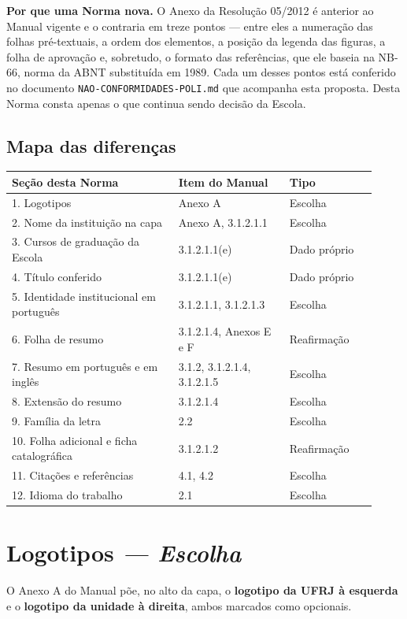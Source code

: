 \documentclass[a4paper,11pt]{article}
\newcommand\tipo[1]{\normalfont\textit{--- #1}}
\begin{document}
\textbf{Por que uma Norma nova.} O Anexo da Resolução 05/2012 é anterior ao
Manual vigente e o contraria em treze pontos --- entre eles a numeração das
folhas pré-textuais, a ordem dos elementos, a posição da legenda das figuras, a
folha de aprovação e, sobretudo, o formato das referências, que ele baseia na
NB-66, norma da ABNT substituída em 1989. Cada um desses pontos está conferido
no documento \texttt{NAO-CONFORMIDADES-POLI.md} que acompanha esta proposta.
Desta Norma consta apenas o que continua sendo decisão da Escola.

\subsection*{Mapa das diferenças}

\begin{longtable}{@{}p{0.42\linewidth}p{0.28\linewidth}p{0.22\linewidth}@{}}
\toprule
\textbf{Seção desta Norma} & \textbf{Item do Manual} & \textbf{Tipo} \\
\midrule
\endhead
1. Logotipos & Anexo A & Escolha\\
2. Nome da instituição na capa & Anexo A, 3.1.2.1.1 & Escolha\\
3. Cursos de graduação da Escola & 3.1.2.1.1(e) & Dado próprio\\
4. Título conferido & 3.1.2.1.1(e) & Dado próprio\\
5. Identidade institucional em português & 3.1.2.1.1, 3.1.2.1.3 & Escolha\\
6. Folha de resumo & 3.1.2.1.4, Anexos E e F & Reafirmação\\
7. Resumo em português e em inglês & 3.1.2, 3.1.2.1.4, 3.1.2.1.5 & Escolha\\
8. Extensão do resumo & 3.1.2.1.4 & Escolha\\
9. Família da letra & 2.2 & Escolha\\
10. Folha adicional e ficha catalográfica & 3.1.2.1.2 & Reafirmação\\
11. Citações e referências & 4.1, 4.2 & Escolha\\
12. Idioma do trabalho & 2.1 & Escolha\\
\bottomrule
\end{longtable}

\section{Logotipos \tipo{Escolha}}

O Anexo A do Manual põe, no alto da capa, o \textbf{logotipo da UFRJ à
esquerda} e o \textbf{logotipo da unidade à direita}, ambos marcados como
opcionais.
\end{document}
